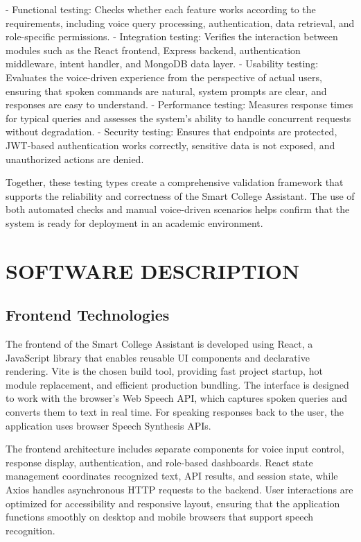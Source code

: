 \documentclass{article}
\begin{document}
- Functional testing: Checks whether each feature works according to the requirements, including voice query processing, authentication, data retrieval, and role-specific permissions.
- Integration testing: Verifies the interaction between modules such as the React frontend, Express backend, authentication middleware, intent handler, and MongoDB data layer.
- Usability testing: Evaluates the voice-driven experience from the perspective of actual users, ensuring that spoken commands are natural, system prompts are clear, and responses are easy to understand.
- Performance testing: Measures response times for typical queries and assesses the system's ability to handle concurrent requests without degradation.
- Security testing: Ensures that endpoints are protected, JWT-based authentication works correctly, sensitive data is not exposed, and unauthorized actions are denied.

Together, these testing types create a comprehensive validation framework that supports the reliability and correctness of the Smart College Assistant. The use of both automated checks and manual voice-driven scenarios helps confirm that the system is ready for deployment in an academic environment.

\section{SOFTWARE DESCRIPTION}

\subsection{Frontend Technologies}
The frontend of the Smart College Assistant is developed using React, a JavaScript library that enables reusable UI components and declarative rendering. Vite is the chosen build tool, providing fast project startup, hot module replacement, and efficient production bundling. The interface is designed to work with the browser's Web Speech API, which captures spoken queries and converts them to text in real time. For speaking responses back to the user, the application uses browser Speech Synthesis APIs.

The frontend architecture includes separate components for voice input control, response display, authentication, and role-based dashboards. React state management coordinates recognized text, API results, and session state, while Axios handles asynchronous HTTP requests to the backend. User interactions are optimized for accessibility and responsive layout, ensuring that the application functions smoothly on desktop and mobile browsers that support speech recognition.
\end{document}
